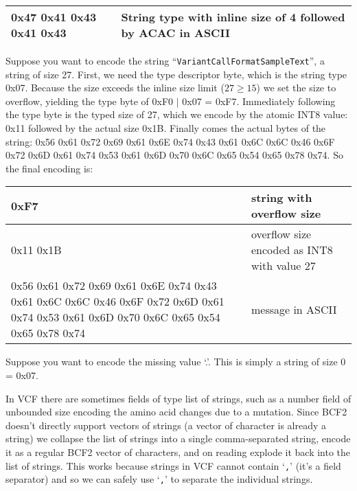 \documentclass[8pt]{article}
\begin{document}
\vspace{0.1cm}
\begin{tabular}{| l | l |} \hline
0x47 0x41 0x43 0x41 0x43 & String type with inline size of 4 followed by ACAC in ASCII \\ \hline
\end{tabular}
\vspace{0.3cm}

Suppose you want to encode the string ``{\tt VariantCallFormatSampleText}'', a string of size 27.
First, we need the type descriptor byte, which is the string type 0x07.
Because the size exceeds the inline size limit ($27 \geq 15$) we set the size to overflow, yielding the type byte of 0xF0 $|$ 0x07 = 0xF7.
Immediately following the type byte is the typed size of 27, which we encode by the atomic INT8 value: 0x11 followed by the actual size 0x1B.
Finally comes the actual bytes of the string: 0x56 0x61 0x72 0x69 0x61 0x6E 0x74 0x43 0x61 0x6C 0x6C 0x46 0x6F 0x72 0x6D 0x61 0x74 0x53 0x61 0x6D 0x70 0x6C 0x65 0x54 0x65 0x78 0x74.
So the final encoding is:

\vspace{0.3cm}
\begin{tabular}{ | p{9cm} | p{6cm} | } \hline
0xF7 & string with overflow size \\ \hline
0x11 0x1B & overflow size encoded as INT8 with value 27 \\ \hline
0x56 0x61 0x72 0x69 0x61 0x6E 0x74 0x43 0x61 0x6C 0x6C 0x46 0x6F 0x72 0x6D 0x61 0x74 0x53 0x61 0x6D 0x70 0x6C 0x65 0x54 0x65 0x78 0x74 & message in ASCII \\ \hline
\end{tabular}
\vspace{0.3cm}

Suppose you want to encode the missing value `.'.
This is simply a string of size 0 = 0x07.

\vspace{0.3cm}
In VCF there are sometimes fields of type list of strings, such as a number field of unbounded size encoding the amino acid changes due to a mutation.
Since BCF2 doesn't directly support vectors of strings (a vector of character is already a string) we collapse the list of strings into a single comma-separated string, encode it as a regular BCF2 vector of characters, and on reading explode it back into the list of strings.
This works because strings in VCF cannot contain `{\tt ,}' (it's a field separator) and so we can safely use `{\tt ,}' to separate the individual strings.
\end{document}
